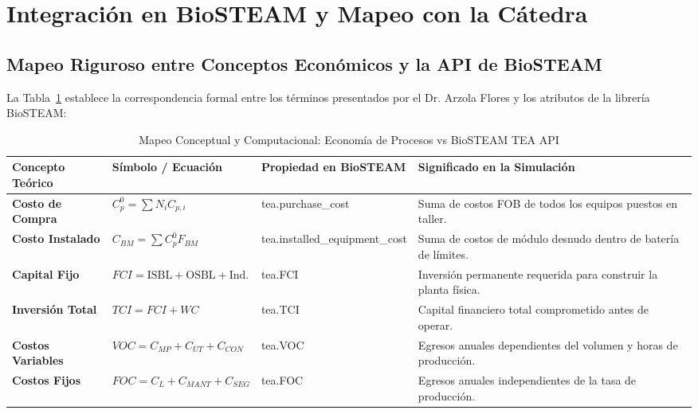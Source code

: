 \documentclass[11pt,letterpaper]{article}
\begin{document}
\section{Integración en BioSTEAM y Mapeo con la Cátedra}

\subsection{Mapeo Riguroso entre Conceptos Económicos y la API de BioSTEAM}
La Tabla~\ref{tab:mapeo_biosteam} establece la correspondencia formal entre los términos presentados por el Dr. Arzola Flores y los atributos de la librería BioSTEAM:

\begin{table}[htbp]
    \centering
    \small
    \caption{Mapeo Conceptual y Computacional: Economía de Procesos vs BioSTEAM TEA API}
    \label{tab:mapeo_biosteam}
    \footnotesize
    \setlength{\tabcolsep}{3.5pt}
    \begin{tabularx}{\textwidth}{>{\raggedright\arraybackslash}p{2.6cm} >{\raggedright\arraybackslash}p{2.8cm} >{\raggedright\arraybackslash\ttfamily}p{3.8cm} X}
        \toprule
        \rowcolor{tableheader}
        \textbf{\color{white}Concepto Teórico} & \textbf{\color{white}Símbolo / Ecuación} & \textbf{\color{white}Propiedad en BioSTEAM} & \textbf{\color{white}Significado en la Simulación} \\
        \midrule
        \textbf{Costo de Compra} & $C_p^0 = \sum N_i C_{p,i}$ & tea.purchase\_cost & Suma de costos FOB de todos los equipos puestos en taller. \\
        \rowcolor{tablerowgray}
        \textbf{Costo Instalado} & $C_{BM} = \sum C_p^0 F_{BM}$ & tea.installed\_\allowbreak equipment\_cost & Suma de costos de módulo desnudo dentro de batería de límites. \\
        \textbf{Capital Fijo} & $FCI = \text{ISBL} + \text{OSBL} + \text{Ind.}$ & tea.FCI & Inversión permanente requerida para construir la planta física. \\
        \rowcolor{tablerowgray}
        \textbf{Inversión Total} & $TCI = FCI + WC$ & tea.TCI & Capital financiero total comprometido antes de operar. \\
        \textbf{Costos Variables} & $VOC = C_{MP} + C_{UT} + C_{CON}$ & tea.VOC & Egresos anuales dependientes del volumen y horas de producción. \\
        \rowcolor{tablerowgray}
        \textbf{Costos Fijos} & $FOC = C_L + C_{MANT} + C_{SEG}$ & tea.FOC & Egresos anuales independientes de la tasa de producción. \\

\end{tabularx}
\end{table}
\end{document}
